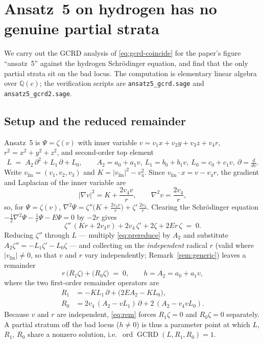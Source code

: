 \documentclass[11pt]{article}
\newcommand{\code}[1]{\texttt{#1}}
\DeclareMathOperator{\GCRD}{GCRD}
\DeclareMathOperator{\ord}{ord}
\newcommand{\vlin}{v_{\mathrm{lin}}}
\begin{document}
\section{Ansatz~5 on hydrogen has no genuine partial strata}
\label{sec:ansatz5}

We carry out the GCRD analysis of \eqref{eq:gcrd-coincide} for the paper's
figure ``ansatz~5'' against the hydrogen Schr\"odinger equation, and find that
the only partial strata sit on the bad locus. The computation is elementary
linear algebra over $\mathbb{Q}(c)$; the verification scripts are
\code{ansatz5\_gcrd.sage} and \code{ansatz5\_gcrd2.sage}.

\subsection{Setup and the reduced remainder}

Ansatz~5 is $\Psi=\zeta(v)$ with inner variable
$v=v_1x+v_2y+v_3z+v_4r$, $r^2=x^2+y^2+z^2$, and second-order top element
\begin{equation}
\label{eq:L}
L\;=\;A_2\,\partial^2+L_1\,\partial+L_0,\qquad
A_2=a_0+a_1v,\ L_1=b_0+b_1v,\ L_0=c_0+c_1v,\ \partial=\tfrac{d}{dv}.
\end{equation}
Write $\vlin=(v_1,v_2,v_3)$ and $K=|\vlin|^2-v_4^2$. Since
$v_{\mathrm{lin}}\!\cdot x=v-v_4r$, the gradient and Laplacian of the inner
variable are
\[
|\nabla v|^2=K+\frac{2v_4v}{r},\qquad \nabla^2v=\frac{2v_4}{r},
\]
so, for $\Psi=\zeta(v)$,
$\nabla^2\Psi=\zeta''\big(K+\tfrac{2v_4v}{r}\big)+\zeta'\,\tfrac{2v_4}{r}$.
Clearing the Schr\"odinger equation $-\tfrac12\nabla^2\Psi-\tfrac1r\Psi-E\Psi=0$
by $-2r$ gives
\begin{equation}
\label{eq:prereduce}
\zeta''\,(Kr+2v_4v)+2v_4\,\zeta'+2\zeta+2Er\,\zeta \;=\;0 .
\end{equation}
Reducing $\zeta''$ through $L$ --- multiply \eqref{eq:prereduce} by $A_2$ and
substitute $A_2\zeta''=-L_1\zeta'-L_0\zeta$ --- and collecting on the
\emph{independent} radical $r$ (valid where $|\vlin|\neq0$, so that $v$ and $r$
vary independently; Remark~\ref{rem:generic}) leaves a remainder
\begin{equation}
\label{eq:rem}
r\,\big(R_1\zeta\big)+\big(R_0\zeta\big)\;=\;0,
\qquad h=A_2=a_0+a_1v,
\end{equation}
where the two first-order remainder operators are
\begin{align}
\label{eq:R1}
R_1&=-K L_1\,\partial+\big(2E A_2-K L_0\big),\\
\label{eq:R0}
R_0&=2v_4\,(A_2-vL_1)\,\partial+2\,(A_2-v_4vL_0).
\end{align}
Because $v$ and $r$ are independent, \eqref{eq:rem} forces $R_1\zeta=0$ and
$R_0\zeta=0$ separately. A partial stratum off the bad locus ($h\ne0$) is thus a
parameter point at which $L$, $R_1$, $R_0$ share a nonzero solution, i.e.\
$\ord\GCRD(L,R_1,R_0)=1$.
\end{document}
